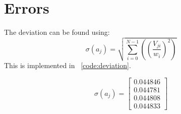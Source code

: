 \section{Errors}
The deviation can be found using:
\[
\sigma\left(a_j\right) = \sqrt{ \sum_{i=0}^{N-1} \left( \left( \frac{V_{ji}}{w_i}\right)^2\right) }
\]
This is implemented in \lstlistingname~\ref{code:deviation}.


\begin{equation}
\sigma\left(a_j\right) = 
\left[
\begin{array}{c}
 0.044846 \\
 0.044781 \\
 0.044808 \\
 0.044833
\end{array}
\right]
\end{equation}